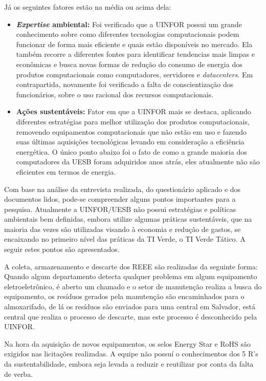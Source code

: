 Já os seguintes fatores estão na média ou acima dela:

\begin{itemize}
    \item \textbf{\textit{Expertise} ambiental:} Foi verificado que a UINFOR possui um grande conhecimento sobre como diferentes tecnologias computacionais podem funcionar de forma mais eficiente e quais estão disponíveis no mercado. Ela também recorre a diferentes fontes para identificar tendencias mais limpas e econômicas e busca novas formas de redução do consumo de energia dos produtos computacionais como computadores, servidores e \textit{datacenters}. Em contrapartida, novamente foi verificado a falta de conscientização dos funcionários, sobre o uso racional dos recursos computacionais. 
    \item \textbf{Ações sustentáveis:} Fator em que a UINFOR mais se destaca, aplicando diferentes estratégias para melhor utilização dos produtos computacionais, removendo equipamentos computacionais que não estão em uso e fazendo suas últimas aquisições tecnológicas levando em consideração a eficiência energética. O único ponto abaixo foi o fato de como a grande maioria dos computadores da UESB foram adquiridos anos atrás, eles atualmente não são eficientes em termos de energia.
\end{itemize}

Com base na análise da entrevista realizada, do questionário aplicado e dos documentos lidos, pode-se compreender alguns pontos importantes para a pesquisa. Atualmente a UINFOR/UESB não possui estratégias e políticas ambientais bem definidas, embora utilize algumas práticas sustentáveis, que na maioria das vezes são utilizadas visando à economia e redução de gastos, se encaixando no primeiro nível das práticas da TI Verde, o TI Verde Tático. A seguir estes pontos são apresentados. 

A coleta, armazenamento e descarte dos REEE são realizadas da seguinte forma: Quando algum departamento detecta qualquer problema em algum equipamento eletroeletrônico, é aberto um chamado e o setor de manutenção realiza a busca do equipamento, os resíduos gerados pela manutenção são encaminhados para o almoxarifado, de lá os resíduos são enviados para uma central em Salvador, está central que realiza o processo de descarte, mas este processo é desconhecido pela UINFOR.

Na hora da aquisição de novos equipamentos, os selos Energy Star e RoHS são exigidos nas licitações realizadas. A equipe não possuí o conhecimentos dos 5 R's da sustentabilidade, embora seja levada a reduzir e reutilizar por conta da falta de verba.

